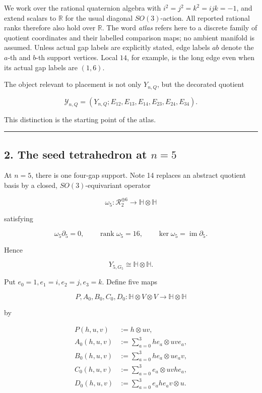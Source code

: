 \documentclass[
  11pt,
  a4paper,
]{article}
\begin{document}
We work over the rational quaternion algebra with
\(i^2=j^2=k^2=ijk=-1\), and extend scalars to \(\mathbb R\) for the
usual diagonal \(SO(3)\)-action. All reported rational ranks therefore
also hold over \(\mathbb R\). The word \emph{atlas} refers here to a
discrete family of quotient coordinates and their labelled comparison
maps; no ambient manifold is assumed. Unless actual gap labels are
explicitly stated, edge labels \(ab\) denote the \(a\)-th and \(b\)-th
support vertices. Local \(14\), for example, is the long edge even when
its actual gap labels are \((1,6)\).

The object relevant to placement is not only \(Y_{n,Q}\), but the
decorated quotient

\[
\mathscr Y_{n,Q}
=
\left(Y_{n,Q};E_{12},E_{13},E_{14},E_{23},E_{24},E_{34}\right).
\tag{1.9}
\]

This distinction is the starting point of the atlas.

\begin{center}\rule{0.5\linewidth}{0.5pt}\end{center}

\hypertarget{the-seed-tetrahedron-at-n5}{%
\subsection{\texorpdfstring{2. The seed tetrahedron at
\(n=5\)}{2. The seed tetrahedron at n=5}}\label{the-seed-tetrahedron-at-n5}}

At \(n=5\), there is one four-gap support. Note 14 replaces an abstract
quotient basis by a closed, \(SO(3)\)-equivariant operator

\[
\omega_5:
\mathcal R_2^{\oplus6}
\longrightarrow
\mathbb H\otimes\mathbb H
\tag{2.1}
\]

satisfying

\[
\boxed{
\omega_5\partial_5=0,
\qquad
\operatorname{rank}\omega_5=16,
\qquad
\ker\omega_5=\operatorname{im}\partial_5.
}
\tag{2.2}
\]

Hence

\[
Y_{5,G_5}\cong\mathbb H\otimes\mathbb H.
\tag{2.3}
\]

Put \(e_0=1,e_1=i,e_2=j,e_3=k\). Define five maps

\[
P,A_0,B_0,C_0,D_0:
\mathbb H\otimes V\otimes V
\longrightarrow\mathbb H\otimes\mathbb H
\]

by

\[
\begin{aligned}
P(h,u,v)
&:=h\otimes uv,\\[1mm]
A_0(h,u,v)
&:=\sum_{a=0}^{3}he_a\otimes uv e_a,\\[1mm]
B_0(h,u,v)
&:=\sum_{a=0}^{3}he_a\otimes u e_a v,\\[1mm]
C_0(h,u,v)
&:=\sum_{a=0}^{3}e_a\otimes uvh e_a,\\[1mm]
D_0(h,u,v)
&:=\sum_{a=0}^{3}e_a h e_a v\otimes u.
\end{aligned}
\]
\end{document}
